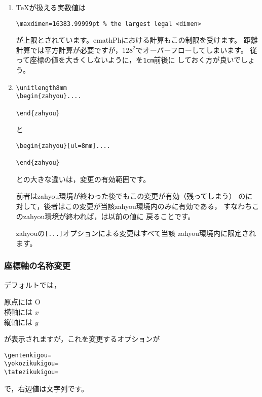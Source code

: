 \begin{enumerate}[注 1.~]
  \item \TeX が扱える実数値は
\begin{jquote}
\begin{verbatim}
\maxdimen=16383.99999pt % the largest legal <dimen>
\end{verbatim}
\end{jquote}
が上限とされています。\textsf{emathPh}における計算もこの制限を受けます。
距離計算では平方計算が必要ですが，$128^2$でオーバーフローしてしまいます。
従って座標の値を大きくしないように，を\verb/1cm/前後に
しておく方が良いでしょう。
  \item
\begin{jquote}
\begin{verbatim}
\unitlength8mm
\begin{zahyou}....

\end{zahyou}
\end{verbatim}
\end{jquote}
と
\begin{jquote}
\begin{verbatim}
\begin{zahyou}[ul=8mm]....

\end{zahyou}
\end{verbatim}
\end{jquote}
との大きな違いは，変更の有効範囲です。

前者は\textsf{zahyou}環境が終わった後でもこの変更が有効（残ってしまう）
のに対して，後者はこの変更が当該\textsf{zahyou}環境内のみに有効である，
すなわちこの\textsf{zahyou}環境が終われば，は以前の値に
戻ることです。

\textsf{zahyou}の\verb+[...]+オプションによる変更はすべて当該
\textsf{zahyou}環境内に限定されます。
\end{enumerate}

\subsubsection{座標軸の名称変更}
デフォルトでは，
\begin{jquote}
原点には O\\
横軸には $x$\\
縦軸には $y$
\end{jquote}
が表示されますが，これを変更するオプションが
\begin{jquote}
\begin{verbatim}
\gentenkigou=
\yokozikukigou=
\tatezikukigou=
\end{verbatim}
\end{jquote}
で，右辺値は文字列です。

